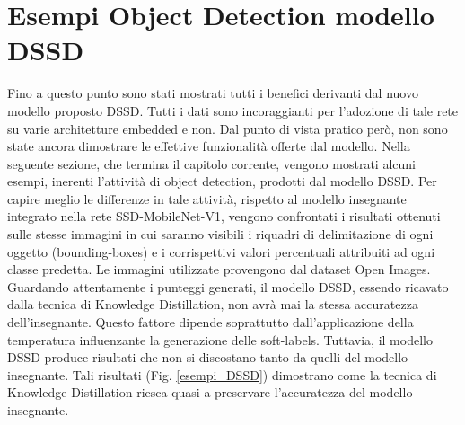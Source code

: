 \section{Esempi Object Detection modello DSSD}
Fino a questo punto sono stati mostrati tutti i benefici derivanti dal nuovo 
modello proposto DSSD. Tutti i dati sono incoraggianti per l'adozione di 
tale rete su varie architetture embedded e non. Dal punto di vista pratico 
però, non sono state ancora dimostrare le effettive funzionalità offerte dal 
modello. Nella seguente sezione, che termina il capitolo corrente, vengono 
mostrati alcuni esempi, inerenti l'attività di object detection, prodotti dal 
modello DSSD. Per capire meglio le differenze in tale attività, rispetto al 
modello insegnante integrato nella rete SSD-MobileNet-V1, vengono confrontati 
i risultati ottenuti sulle stesse immagini in cui saranno visibili i 
riquadri di delimitazione di ogni oggetto (bounding-boxes) e i corrispettivi 
valori percentuali attribuiti ad ogni classe predetta. Le immagini utilizzate 
provengono dal dataset Open Images. Guardando attentamente i punteggi 
generati, il modello DSSD, essendo ricavato dalla tecnica di Knowledge 
Distillation, non avrà mai la stessa accuratezza dell'insegnante. Questo 
fattore dipende soprattutto dall'applicazione della temperatura influenzante 
la generazione delle soft-labels. Tuttavia, il modello DSSD produce risultati 
che non si discostano tanto da quelli del modello insegnante. Tali risultati 
(Fig. \ref{esempi_DSSD}) dimostrano come la tecnica di Knowledge Distillation riesca 
quasi a preservare l'accuratezza del modello insegnante. 
